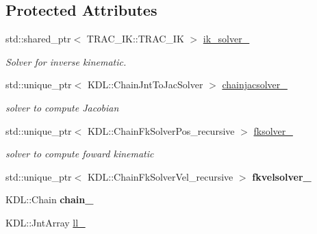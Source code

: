 \subsection*{Protected Attributes}
\begin{DoxyCompactItemize}
\item 
\mbox{\label{classrobot_1_1_robot_model_abfbd3ae39de9f8e7b93e9aeb3786c36f}} 
std\+::shared\+\_\+ptr$<$ T\+R\+A\+C\+\_\+\+I\+K\+::\+T\+R\+A\+C\+\_\+\+IK $>$ \hyperlink{classrobot_1_1_robot_model_abfbd3ae39de9f8e7b93e9aeb3786c36f}{ik\+\_\+solver\+\_\+}
\begin{DoxyCompactList}\small\item\em Solver for inverse kinematic. \end{DoxyCompactList}\item 
\mbox{\label{classrobot_1_1_robot_model_a761085c8ff1e659414d64df6367d39aa}} 
std\+::unique\+\_\+ptr$<$ K\+D\+L\+::\+Chain\+Jnt\+To\+Jac\+Solver $>$ \hyperlink{classrobot_1_1_robot_model_a761085c8ff1e659414d64df6367d39aa}{chainjacsolver\+\_\+}
\begin{DoxyCompactList}\small\item\em solver to compute Jacobian \end{DoxyCompactList}\item 
\mbox{\label{classrobot_1_1_robot_model_ad988e5bad1a740a95a51b8d766af8d19}} 
std\+::unique\+\_\+ptr$<$ K\+D\+L\+::\+Chain\+Fk\+Solver\+Pos\+\_\+recursive $>$ \hyperlink{classrobot_1_1_robot_model_ad988e5bad1a740a95a51b8d766af8d19}{fksolver\+\_\+}
\begin{DoxyCompactList}\small\item\em solver to compute foward kinematic \end{DoxyCompactList}\item 
\mbox{\label{classrobot_1_1_robot_model_ad4917ada170359a061a8e3d2ca7a014e}} 
std\+::unique\+\_\+ptr$<$ K\+D\+L\+::\+Chain\+Fk\+Solver\+Vel\+\_\+recursive $>$ {\bfseries fkvelsolver\+\_\+}
\item 
\mbox{\label{classrobot_1_1_robot_model_a89cbadd5ced3064b11ede9f6a3ec2b83}} 
K\+D\+L\+::\+Chain {\bfseries chain\+\_\+}
\item 
K\+D\+L\+::\+Jnt\+Array \hyperlink{classrobot_1_1_robot_model_ae95f99997c72dc7d80c6e26589207a83}{ll\+\_\+}

\end{DoxyCompactItemize}
